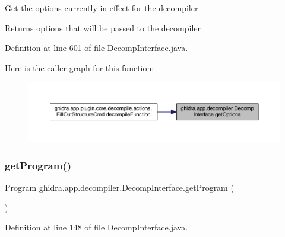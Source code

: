 Get the options currently in effect for the decompiler

\begin{DoxyReturn}{Returns}
options that will be passed to the decompiler 
\end{DoxyReturn}


Definition at line 601 of file Decomp\+Interface.\+java.

Here is the caller graph for this function\+:
\nopagebreak
\begin{figure}[H]
\begin{center}
\leavevmode
\includegraphics[width=350pt]{classghidra_1_1app_1_1decompiler_1_1_decomp_interface_a4a49d6b06c33e71fb1d336703d6b49cb_icgraph}
\end{center}
\end{figure}
\mbox{\label{classghidra_1_1app_1_1decompiler_1_1_decomp_interface_a63b31332733fec7ab8cb2b87669203bc}} 
\subsubsection{\texorpdfstring{getProgram()}{getProgram()}}
{\footnotesize\ttfamily Program ghidra.\+app.\+decompiler.\+Decomp\+Interface.\+get\+Program (\begin{DoxyParamCaption}{ }\end{DoxyParamCaption})\hspace{0.3cm}{\ttfamily [inline]}}



Definition at line 148 of file Decomp\+Interface.\+java.

\mbox{\label{classghidra_1_1app_1_1decompiler_1_1_decomp_interface_a48e34641720039c672e1ea1ad3284e67}} 
